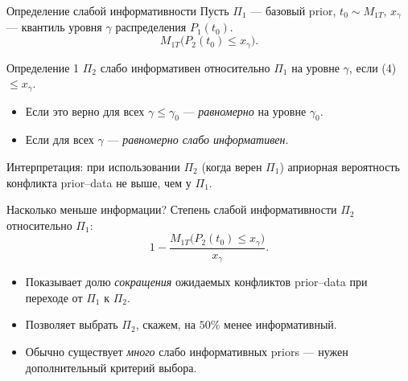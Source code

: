 \documentclass[aspectratio=169,10pt]{beamer}
\begin{document}
\begin{frame}{Определение слабой информативности}
  Пусть $\Pi_1$ — базовый prior, $t_0 \sim M_{1T}$, $x_\gamma$ — квантиль уровня $\gamma$
  распределения $P_1(t_0)$.
  \[
    M_{1T}\bigl(P_2(t_0) \le x_\gamma\bigr).
    \tag{4}
  \]

  \begin{block}{Определение 1}
    $\Pi_2$ \alert{слабо информативен} относительно $\Pi_1$ на уровне $\gamma$,
    если (4) $\le x_\gamma$.
    \begin{itemize}
      \item Если это верно для всех $\gamma\le\gamma_0$ — \emph{равномерно} на уровне $\gamma_0$.
      \item Если для всех $\gamma$ — \emph{равномерно слабо информативен}.
    \end{itemize}
  \end{block}

  Интерпретация: при использовании $\Pi_2$ (когда верен $\Pi_1$)
  априорная вероятность конфликта prior--data \alert{не выше}, чем у $\Pi_1$.
\end{frame}

\begin{frame}{Насколько меньше информации?}
  Степень слабой информативности $\Pi_2$ относительно $\Pi_1$:
  \[
    1 - \frac{M_{1T}\bigl(P_2(t_0) \le x_\gamma\bigr)}{x_\gamma}.
    \tag{5}
  \]
  \begin{itemize}
    \item Показывает долю \emph{сокращения} ожидаемых конфликтов prior--data
          при переходе от $\Pi_1$ к $\Pi_2$.
    \item Позволяет выбрать $\Pi_2$, скажем, на $50\%$ менее информативный.
    \item Обычно существует \emph{много} слабо информативных priors —
          нужен дополнительный критерий выбора.
  \end{itemize}
\end{frame}
\end{document}
